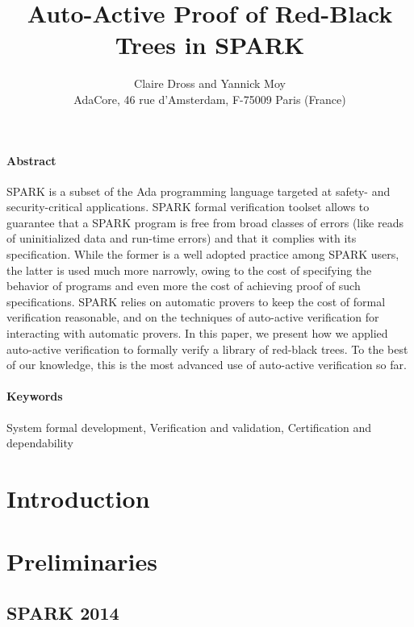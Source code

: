 \documentclass[11pt,a4paper]{article}
\begin{document}
\title{Auto-Active Proof of Red-Black Trees in SPARK}

\author{%
\large Claire Dross and Yannick Moy\\
\normalsize AdaCore, 46 rue d'Amsterdam, F-75009 Paris (France)}

\date{}

\maketitle

\paragraph{Abstract}
SPARK is a subset of the Ada programming language targeted at safety- and
security-critical applications. SPARK formal verification toolset allows to
guarantee that a SPARK program is free from broad classes of errors (like reads
of uninitialized data and run-time errors) and that it complies with its
specification. While the former is a well adopted practice among SPARK users,
the latter is used much more narrowly, owing to the cost of specifying the
behavior of programs and even more the cost of achieving proof of such
specifications. SPARK relies on automatic provers to keep the cost of formal
verification reasonable, and on the techniques of auto-active verification for
interacting with automatic provers. In this paper, we present how we applied
auto-active verification to formally verify a library of red-black trees. To
the best of our knowledge, this is the most advanced use of auto-active
verification so far.

\paragraph{Keywords}
System formal development, Verification and validation,
Certification and dependability

\section{Introduction}

\section{Preliminaries}
\subsection{SPARK 2014}
\end{document}
